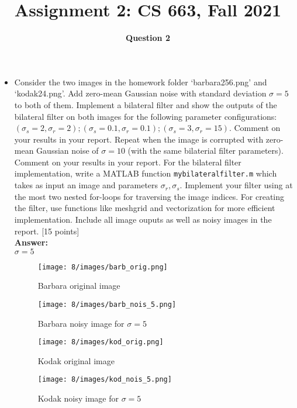 \documentclass[12pt]{article}
\title{Assignment 2: CS 663, Fall 2021}
\author{\textbf{Question 2}}
\date{}
\begin{document}
\maketitle

\begin{itemize}
    \item Consider the two images in the homework folder `barbara256.png' and `kodak24.png'. Add zero-mean Gaussian noise with standard deviation $\sigma = 5$ to both of them. Implement a bilateral filter and show the outputs of the bilateral filter on both images for the following parameter configurations: $(\sigma_s = 2, \sigma_r = 2); (\sigma_s = 0.1, \sigma_r = 0.1); (\sigma_s = 3, \sigma_r = 15)$. Comment on your results in your report. Repeat when the image is corrupted with zero-mean Gaussian noise of $\sigma = 10$ (with the same bilaterial filter parameters). Comment on your results in your report. For the bilateral filter implementation, write a MATLAB function \texttt{mybilateralfilter.m} which takes as input an image and parameters $\sigma_r, \sigma_s$. Implement your filter using at the most two nested for-loops for traversing the image indices. For creating the filter, use functions like meshgrid and vectorization for more efficient implementation. Include all image ouputs as well as noisy images in the report. \textsf{[15 points]}
    \vspace*{0.5cm}\\
    \textbf{Answer:} \\
    $\sigma = 5$
    \begin{figure}[H]
        \centering
        \begin{minipage}{.45\textwidth}
          \centering
          \texttt{[image: 8/images/barb\_orig.png]}
          \caption*{Barbara original image}
          \label{fig:totalpowervst}
        \end{minipage}
        \begin{minipage}{.45\textwidth}
          \centering
          \texttt{[image: 8/images/barb\_nois\_5.png]}
          \caption*{Barbara noisy image for $\sigma = 5$}
          \label{fig:totalpower2}
        \end{minipage}
        \label{fig:totalPower}
    \end{figure}
    
    \begin{figure}[H]
        \centering
        \begin{minipage}{.45\textwidth}
          \centering
          \texttt{[image: 8/images/kod\_orig.png]}
          \caption*{Kodak original image}
          \label{fig:totalpowervst}
        \end{minipage}
        \begin{minipage}{.45\textwidth}
          \centering
          \texttt{[image: 8/images/kod\_nois\_5.png]}
          \caption*{Kodak noisy image for $\sigma = 5$}
          \label{fig:totalpower2}
        \end{minipage}
        \label{fig:totalPower}
    \end{figure}
    

\end{itemize}
\end{document}
